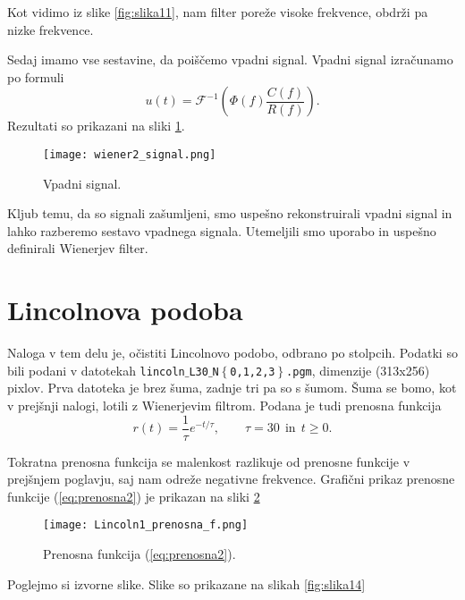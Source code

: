 \documentclass[12pt,a4paper]{article}
\begin{document}
\noindent Kot vidimo iz slike \ref{fig:slika11}, nam filter poreže visoke frekvence, obdrži pa nizke frekvence.

Sedaj imamo vse sestavine, da poiščemo vpadni signal. Vpadni signal izračunamo po formuli
\begin{equation}
u(t)=\mathcal{F}^{-1}\left( \Phi(f) \frac{C(f)}{R(f)}\right).
\end{equation}
Rezultati so prikazani na sliki \ref{fig:slika12}.

\begin{figure}[H]
    \centering
        \texttt{[image: wiener2\_signal.png]}
    \caption{Vpadni signal.} \label{fig:slika12}
\end{figure}

\noindent Kljub temu, da so signali zašumljeni, smo uspešno rekonstruirali vpadni signal in lahko razberemo sestavo vpadnega signala. Utemeljili smo uporabo in uspešno definirali Wienerjev filter. 

\section*{Lincolnova podoba}

Naloga v tem delu je, očistiti Lincolnovo podobo, odbrano po stolpcih. Podatki so bili podani v datotekah \texttt{lincoln$\_$L30$\_$N$\left\lbrace \right.$0,1,2,3$ \left. \right\rbrace$.pgm}, dimenzije (313x256) pixlov. Prva datoteka je brez šuma, zadnje tri pa so s šumom. Šuma se bomo, kot v prejšnji nalogi, lotili z Wienerjevim filtrom. Podana je tudi prenosna funkcija
\begin{equation} \label{eq:prenosna2}
r(t)= \frac{1}{\tau} e^{-t/ \tau}, \qquad \tau=30 \ \ \textrm{in} \ \ t \ge 0.
\end{equation}

Tokratna prenosna funkcija se malenkost razlikuje od prenosne funkcije v prejšnjem poglavju, saj nam odreže negativne frekvence. Grafični prikaz prenosne funkcije (\ref{eq:prenosna2}) je prikazan na sliki \ref{fig:slika13}

\begin{figure}[H]
    \centering
        \texttt{[image: Lincoln1\_prenosna\_f.png]}
    \caption{Prenosna funkcija (\ref{eq:prenosna2}).} \label{fig:slika13}
\end{figure}

Poglejmo si izvorne slike. Slike so prikazane na slikah \ref{fig:slika14}
\end{document}
